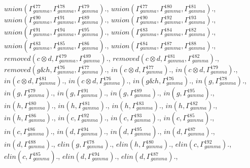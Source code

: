 \documentclass[a4paper, 11pt]{article}
\begin{document}
$union(\Gamma_{gamma}^{177}, \Gamma_{gamma}^{178}, \Gamma_{gamma}^{179}).$, $union(\Gamma_{gamma}^{177}, \Gamma_{gamma}^{180}, \Gamma_{gamma}^{181}).$, $union(\Gamma_{gamma}^{190}, \Gamma_{gamma}^{191}, \Gamma_{gamma}^{189}).$, $union(\Gamma_{gamma}^{190}, \Gamma_{gamma}^{192}, \Gamma_{gamma}^{193}).$, $union(\Gamma_{gamma}^{191}, \Gamma_{gamma}^{194}, \Gamma_{gamma}^{195}).$, $union(\Gamma_{gamma}^{183}, \Gamma_{gamma}^{184}, \Gamma_{gamma}^{182}).$, $union(\Gamma_{gamma}^{183}, \Gamma_{gamma}^{185}, \Gamma_{gamma}^{186}).$, $union(\Gamma_{gamma}^{184}, \Gamma_{gamma}^{187}, \Gamma_{gamma}^{188}).$, $removed(c \otimes d, \Gamma_{gamma}^{179}, \Gamma_{gamma}^{189}).$, $removed(c \otimes d, \Gamma_{gamma}^{181}, \Gamma_{gamma}^{182}).$, $removed(g \binampersand h, \Gamma_{gamma}^{176}, \Gamma_{gamma}^{177}).$, $in(c \otimes d, \Gamma_{gamma}^{177}).$, $in(c \otimes d, \Gamma_{gamma}^{179}).$, $in(c \otimes d, \Gamma_{gamma}^{181}).$, $in(c \otimes d, \Gamma_{gamma}^{176}).$, $in(g \binampersand h, \Gamma_{gamma}^{176}).$, $in(g, \Gamma_{gamma}^{178}).$, $in(g, \Gamma_{gamma}^{179}).$, $in(g, \Gamma_{gamma}^{191}).$, $in(g, \Gamma_{gamma}^{189}).$, $in(g, \Gamma_{gamma}^{195}).$, $in(h, \Gamma_{gamma}^{180}).$, $in(h, \Gamma_{gamma}^{181}).$, $in(h, \Gamma_{gamma}^{183}).$, $in(h, \Gamma_{gamma}^{182}).$, $in(h, \Gamma_{gamma}^{186}).$, $in(c, \Gamma_{gamma}^{192}).$, $in(c, \Gamma_{gamma}^{193}).$, $in(c, \Gamma_{gamma}^{185}).$, $in(c, \Gamma_{gamma}^{186}).$, $in(d, \Gamma_{gamma}^{194}).$, $in(d, \Gamma_{gamma}^{195}).$, $in(d, \Gamma_{gamma}^{187}).$, $in(d, \Gamma_{gamma}^{188}).$, $elin(g, \Gamma_{gamma}^{178}).$, $elin(h, \Gamma_{gamma}^{180}).$, $elin(c, \Gamma_{gamma}^{192}).$, $elin(c, \Gamma_{gamma}^{185}).$, $elin(d, \Gamma_{gamma}^{194}).$, $elin(d, \Gamma_{gamma}^{187}).$, 
\end{document}
